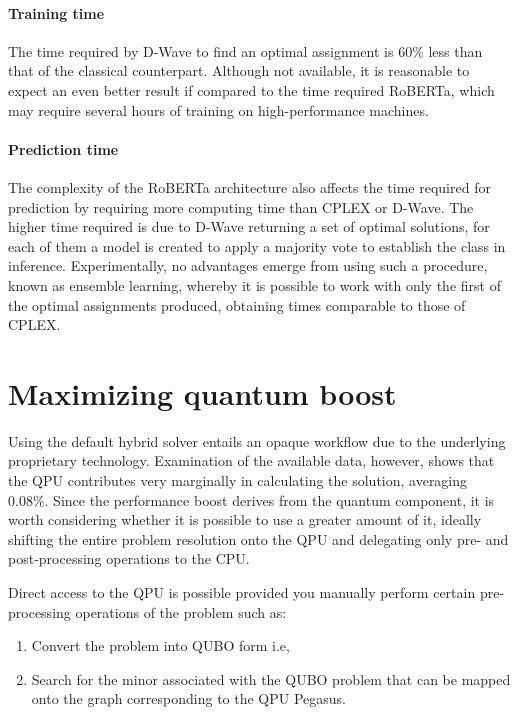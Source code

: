 \documentclass{ceurart}
\begin{document}
\begin{spacing}{1}
\paragraph{Training time} The time required by D-Wave to find an optimal assignment is 60\% less than that of the classical counterpart. Although not available, it is reasonable to expect an even better result if compared to the time required RoBERTa, which may require several hours of training on high-performance machines.

\paragraph{Prediction time} The complexity of the RoBERTa architecture also affects the time required for prediction by requiring more computing time than CPLEX or D-Wave. The higher time required is due to D-Wave returning a set of optimal solutions, for each of them a model is created to apply a majority vote to establish the class in inference. Experimentally, no advantages emerge from using such a procedure, known as ensemble learning, whereby it is possible to work with only the first of the optimal assignments produced, obtaining times comparable to those of CPLEX.

\section{Maximizing quantum boost}

Using the default hybrid solver entails an opaque workflow due to the underlying proprietary technology. Examination of the available data, however, shows that the QPU contributes very marginally in calculating the solution, averaging 0.08\%. Since the performance boost derives from the quantum component, it is worth considering whether it is possible to use a greater amount of it, ideally shifting the entire problem resolution onto the QPU and delegating only pre- and post-processing operations to the CPU.

Direct access to the QPU is possible provided you manually perform certain pre-processing operations of the problem such as:
\begin{enumerate}
   \item Convert the problem into QUBO form i.e,
    \item Search for the minor\cite{ME}\cite{MEdwave} associated with the QUBO problem that can be mapped onto the graph corresponding to the QPU Pegasus\cite{Pegasus}.
\end{enumerate}


\end{spacing}
\end{document}

